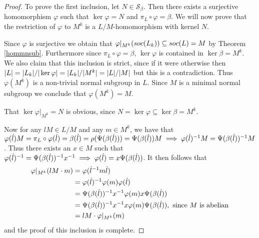 \begin{proof}
    To prove the first inclusion, let $N \in \mathscr{S}_\beta$. Then there exists a surjective homomorphism $\varphi$ such that $\ker \varphi = N$ and $\pi_L \circ \varphi = \beta$. We will now prove that the restriction of $\varphi$ to $M^k$ is a $L/M$-homomorphism with kernel $N$.


    Since $\varphi$ is surjective we obtain that $\varphi|_{M^k}(soc {(L_k)}) \subseteq soc {(L)} = M$ by Theorem \ref{hommnsub}. 
    Furthermore since $\pi_L \circ \varphi = \beta$, $\ker \varphi$ is contained in $\ker \beta = M^k$. 
    We also claim that this inclusion is strict, since if it were otherwise then $| L | = | L_k |/| \ker \varphi | = | L_k |/| M^k | = | L |/| M |$ but this is a contradiction. 
    Thus $\varphi(M^k)$ is a non-trivial normal subgroup in $L$. Since $M$ is a minimal normal subgroup we conclude that $\varphi(M^k) = M$.

    That $\ker \varphi|_{M^k} = N$ is obvious, since $N = \ker \varphi \subseteq \ker \beta = M^k$.

    Now for any $lM \in L/M$ and any $m \in M^k$, we have that $\varphi(\dot{l})M = \pi_L \circ \varphi(\dot{l}) = \beta(\dot{l}) = \rho(\Psi(\beta(\dot{l}))) = \Psi(\beta(\dot{l}))M \implies \varphi(\dot{l})^{-1}M = \Psi(\beta(\dot{l}))^{-1}M$. Thus there exists an $x \in M$ such that $\varphi(\dot{l})^{-1} = \Psi(\beta(\dot{l}))^{-1}x^{-1} \implies \varphi(\dot{l}) = x\Psi(\beta(\dot{l}))$.
    It then follows that
    \begin{align*}
        \varphi|_{M^k}(lM \cdot m) &= \varphi(\dot{l}^{-1} m \dot{l}) \\
        &= \varphi(\dot{l})^{-1} \varphi(m) \varphi(\dot{l}) \\
        &= \Psi(\beta(\dot{l}))^{-1}x^{-1} \varphi(m) x\Psi(\beta(\dot{l})) \\
        &= \Psi(\beta(\dot{l}))^{-1}x^{-1}x \varphi(m) \Psi(\beta(\dot{l})), \text{ since $M$ is abelian} \\
        &= lM \cdot \varphi|_{M^k}(m) 
    \end{align*}
    and the proof of this inclusion is complete.


\end{proof}
